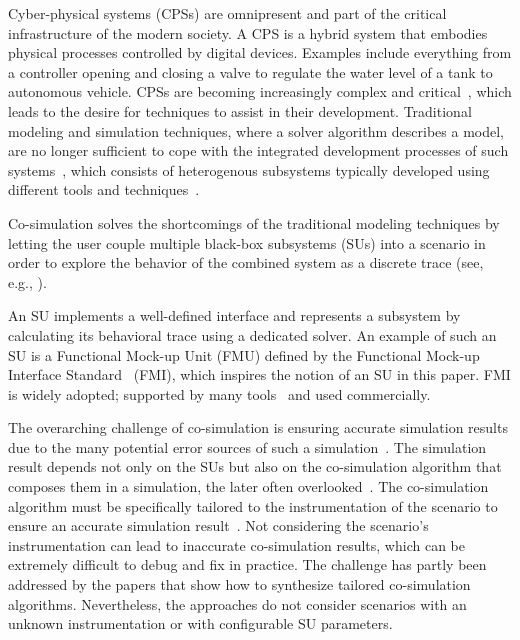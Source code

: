 Cyber-physical systems (CPSs) are omnipresent and part of the critical infrastructure of the modern society.
A CPS is a hybrid system that embodies physical processes controlled by digital devices. Examples include everything from a controller opening and closing a valve to regulate the water level of a tank to autonomous vehicle.
CPSs are becoming increasingly complex and critical~\cite{4519604}, which leads to the desire for techniques to assist in their development.
Traditional modeling and simulation techniques, where a solver algorithm describes a model, are no longer sufficient to cope with the integrated development processes of such systems~\cite{FMI2014}, which consists of heterogenous subsystems typically developed using different tools and techniques~\cite{Paris19}. 

Co-simulation solves the shortcomings of the traditional modeling techniques by letting the user couple multiple black-box subsystems (SUs) into a scenario in order to explore the behavior of the combined system as a discrete trace (see, e.g., \cite{Kubler2000,Gomes2018}).

An SU implements a well-defined interface and represents a subsystem by calculating its behavioral trace using a dedicated solver.
An example of such an SU is a Functional Mock-up Unit (FMU) defined by the Functional Mock-up Interface Standard~\cite{FMI2014} (FMI), which inspires the notion of an SU in this paper. 
FMI is widely adopted; supported by many tools~\cite{Tools_FMI} and used commercially.

The overarching challenge of co-simulation is ensuring accurate simulation results due to the many potential error sources of such a simulation~\cite{Gomes2018}.
The simulation result depends not only on the SUs but also on the co-simulation algorithm that composes them in a simulation, the later often overlooked~\cite{Gomes2019,Oakes2021,Gomes2018f,Schweizer2015c}.
The co-simulation algorithm must be specifically tailored to the instrumentation of the scenario to ensure an accurate simulation result~\cite{hansen_verification_2021}.
Not considering the scenario's instrumentation can lead to inaccurate co-simulation results, which can be extremely difficult to debug and fix in practice.
The challenge has partly been addressed by the papers \cite{Gomes2019,Oakes2021,thrane2021} that show how to synthesize tailored co-simulation algorithms.
Nevertheless, the approaches do not consider scenarios with an unknown instrumentation or with configurable SU parameters.

